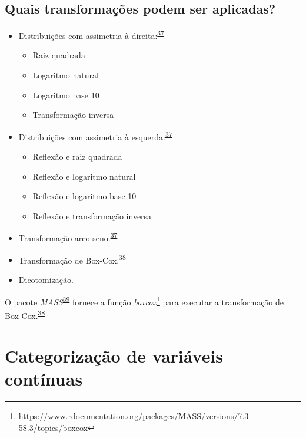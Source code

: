 \documentclass[
]{book}
\renewcommand{\href}[2]{#2\footnote{\url{#1}}}
\newenvironment{infobox}[1]
  {
  \begin{itemize}
  \renewcommand{\labelitemi}{
    \raisebox{-.7\height}[0pt][0pt]{
      {\setkeys{Gin}{width=3em,keepaspectratio}
        \texttt{[image: \#1]}}
    }
  }
  \setlength{\fboxsep}{1em}
  \begin{blackbox}
  \item
  }
  {
  \end{blackbox}
  \end{itemize}
  }
\begin{document}
\hypertarget{quais-transformauxe7uxf5es-podem-ser-aplicadas}{%
\subsection{Quais transformações podem ser aplicadas?}\label{quais-transformauxe7uxf5es-podem-ser-aplicadas}}

\begin{itemize}
\item
  Distribuições com assimetria à direita:\textsuperscript{\protect\hyperlink{ref-osborne2010}{37}}

  \begin{itemize}
  \item
    Raiz quadrada
  \item
    Logaritmo natural
  \item
    Logaritmo base 10
  \item
    Transformação inversa
  \end{itemize}
\item
  Distribuições com assimetria à esquerda:\textsuperscript{\protect\hyperlink{ref-osborne2010}{37}}

  \begin{itemize}
  \item
    Reflexão e raiz quadrada
  \item
    Reflexão e logaritmo natural
  \item
    Reflexão e logaritmo base 10
  \item
    Reflexão e transformação inversa
  \end{itemize}
\item
  Transformação arco-seno.\textsuperscript{\protect\hyperlink{ref-osborne2010}{37}}
\item
  Transformação de Box-Cox.\textsuperscript{\protect\hyperlink{ref-box1964}{38}}
\item
  Dicotomização.
\end{itemize}

\begin{infobox}{images/Rlogo}
O pacote \emph{MASS}\textsuperscript{\protect\hyperlink{ref-MASS}{39}} fornece a função \href{https://www.rdocumentation.org/packages/MASS/versions/7.3-58.3/topics/boxcox}{\emph{boxcox}} para executar a transformação de Box-Cox.\textsuperscript{\protect\hyperlink{ref-box1964}{38}}

\end{infobox}

\hypertarget{categorizacao}{%
\section{Categorização de variáveis contínuas}\label{categorizacao}}
\end{document}
